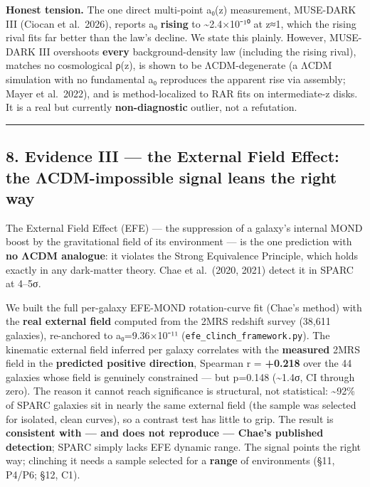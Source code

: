 \documentclass[
]{article}
\begin{document}
\textbf{Honest tension.} The one direct multi-point a₀(z) measurement,
MUSE-DARK III (Ciocan et al.~2026), reports a₀ \textbf{rising} to
\textasciitilde2.4×10⁻¹⁰ at z≈1, which the rising rival fits far better
than the law's decline. We state this plainly. However, MUSE-DARK III
overshoots \textbf{every} background-density law (including the rising
rival), matches no cosmological ρ(z), is shown to be ΛCDM-degenerate (a
ΛCDM simulation with no fundamental a₀ reproduces the apparent rise via
assembly; Mayer et al.~2022), and is method-localized to RAR fits on
intermediate-z disks. It is a real but currently \textbf{non-diagnostic}
outlier, not a refutation.

\begin{center}\rule{0.5\linewidth}{0.5pt}\end{center}

\subsection{8. Evidence III --- the External Field Effect: the
ΛCDM-impossible signal leans the right
way}\label{evidence-iii-the-external-field-effect-the-ux3bbcdm-impossible-signal-leans-the-right-way}

The External Field Effect (EFE) --- the suppression of a galaxy's
internal MOND boost by the gravitational field of its environment --- is
the one prediction with \textbf{no ΛCDM analogue}: it violates the
Strong Equivalence Principle, which holds exactly in any dark-matter
theory. Chae et al.~(2020, 2021) detect it in SPARC at 4--5σ.

We built the full per-galaxy EFE-MOND rotation-curve fit (Chae's method)
with the \textbf{real external field} computed from the 2MRS redshift
survey (38,611 galaxies), re-anchored to a₀=9.36×10⁻¹¹
(\texttt{efe\_clinch\_framework.py}). The kinematic external field
inferred per galaxy correlates with the \textbf{measured} 2MRS field in
the \textbf{predicted positive direction}, Spearman r = \textbf{+0.218}
over the 44 galaxies whose field is genuinely constrained --- but
p=0.148 (\textasciitilde1.4σ, CI through zero). The reason it cannot
reach significance is structural, not statistical: \textasciitilde92\%
of SPARC galaxies sit in nearly the same external field (the sample was
selected for isolated, clean curves), so a contrast test has little to
grip. The result is \textbf{consistent with --- and does not reproduce
--- Chae's published detection}; SPARC simply lacks EFE dynamic range.
The signal points the right way; clinching it needs a sample selected
for a \textbf{range} of environments (§11, P4/P6; §12, C1).
\end{document}
